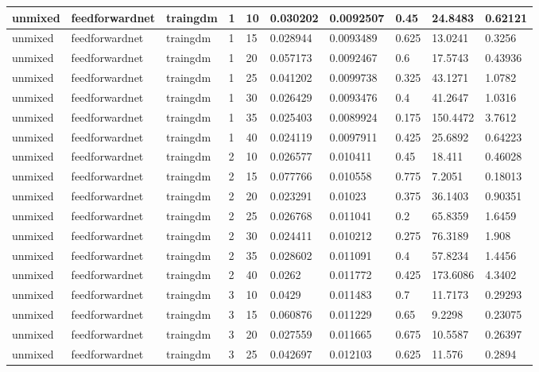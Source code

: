 \begin{longtable}{lllllllll}
unmixed & feedforwardnet & traingdm & 1 & 10 & 0.030202 & 0.0092507 & 0.45 & 24.8483 & 0.62121 \\ \hline 
unmixed & feedforwardnet & traingdm & 1 & 15 & 0.028944 & 0.0093489 & 0.625 & 13.0241 & 0.3256 \\ \hline 
unmixed & feedforwardnet & traingdm & 1 & 20 & 0.057173 & 0.0092467 & 0.6 & 17.5743 & 0.43936 \\ \hline 
unmixed & feedforwardnet & traingdm & 1 & 25 & 0.041202 & 0.0099738 & 0.325 & 43.1271 & 1.0782 \\ \hline 
unmixed & feedforwardnet & traingdm & 1 & 30 & 0.026429 & 0.0093476 & 0.4 & 41.2647 & 1.0316 \\ \hline 
unmixed & feedforwardnet & traingdm & 1 & 35 & 0.025403 & 0.0089924 & 0.175 & 150.4472 & 3.7612 \\ \hline 
unmixed & feedforwardnet & traingdm & 1 & 40 & 0.024119 & 0.0097911 & 0.425 & 25.6892 & 0.64223 \\ \hline 
unmixed & feedforwardnet & traingdm & 2 & 10 & 0.026577 & 0.010411 & 0.45 & 18.411 & 0.46028 \\ \hline 
unmixed & feedforwardnet & traingdm & 2 & 15 & 0.077766 & 0.010558 & 0.775 & 7.2051 & 0.18013 \\ \hline 
unmixed & feedforwardnet & traingdm & 2 & 20 & 0.023291 & 0.01023 & 0.375 & 36.1403 & 0.90351 \\ \hline 
unmixed & feedforwardnet & traingdm & 2 & 25 & 0.026768 & 0.011041 & 0.2 & 65.8359 & 1.6459 \\ \hline 
unmixed & feedforwardnet & traingdm & 2 & 30 & 0.024411 & 0.010212 & 0.275 & 76.3189 & 1.908 \\ \hline 
unmixed & feedforwardnet & traingdm & 2 & 35 & 0.028602 & 0.011091 & 0.4 & 57.8234 & 1.4456 \\ \hline 
unmixed & feedforwardnet & traingdm & 2 & 40 & 0.0262 & 0.011772 & 0.425 & 173.6086 & 4.3402 \\ \hline 
unmixed & feedforwardnet & traingdm & 3 & 10 & 0.0429 & 0.011483 & 0.7 & 11.7173 & 0.29293 \\ \hline 
unmixed & feedforwardnet & traingdm & 3 & 15 & 0.060876 & 0.011229 & 0.65 & 9.2298 & 0.23075 \\ \hline 
unmixed & feedforwardnet & traingdm & 3 & 20 & 0.027559 & 0.011665 & 0.675 & 10.5587 & 0.26397 \\ \hline 
unmixed & feedforwardnet & traingdm & 3 & 25 & 0.042697 & 0.012103 & 0.625 & 11.576 & 0.2894 \\ \hline 

\end{longtable}
